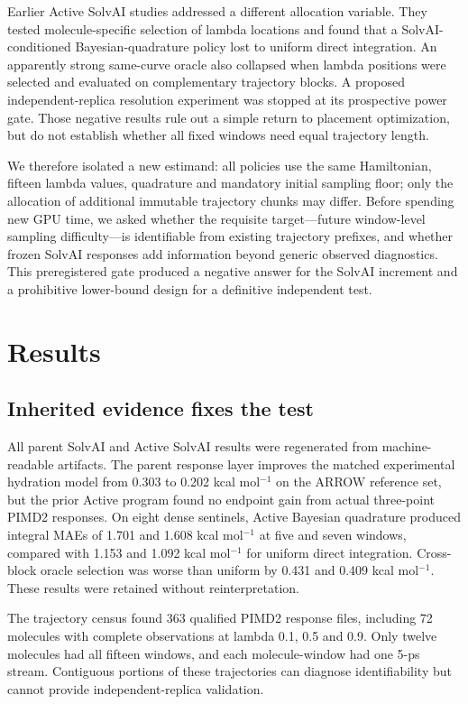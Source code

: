 \documentclass[11pt]{article}
\begin{document}
Earlier Active SolvAI studies addressed a different allocation variable. They tested
molecule-specific selection of lambda locations and found that a SolvAI-conditioned
Bayesian-quadrature policy lost to uniform direct integration. An apparently strong
same-curve oracle also collapsed when lambda positions were selected and evaluated on
complementary trajectory blocks. A proposed independent-replica resolution experiment
was stopped at its prospective power gate. Those negative results rule out a simple
return to placement optimization, but do not establish whether all fixed windows need
equal trajectory length.

We therefore isolated a new estimand: all policies use the same Hamiltonian, fifteen
lambda values, quadrature and mandatory initial sampling floor; only the allocation of
additional immutable trajectory chunks may differ. Before spending new GPU time, we
asked whether the requisite target---future window-level sampling difficulty---is
identifiable from existing trajectory prefixes, and whether frozen SolvAI responses
add information beyond generic observed diagnostics. This preregistered gate produced
a negative answer for the SolvAI increment and a prohibitive lower-bound design for a
definitive independent test.

\section{Results}

\subsection{Inherited evidence fixes the test}

All parent SolvAI and Active SolvAI results were regenerated from machine-readable
artifacts. The parent response layer improves the matched experimental hydration model
from 0.303 to 0.202 kcal mol$^{-1}$ on the ARROW reference set, but the prior Active
program found no endpoint gain from actual three-point PIMD2 responses. On eight dense
sentinels, Active Bayesian quadrature produced integral MAEs of 1.701 and 1.608 kcal
mol$^{-1}$ at five and seven windows, compared with 1.153 and 1.092 kcal mol$^{-1}$
for uniform direct integration. Cross-block oracle selection was worse than uniform by
0.431 and 0.409 kcal mol$^{-1}$. These results were retained without reinterpretation.

The trajectory census found 363 qualified PIMD2 response files, including 72 molecules
with complete observations at lambda 0.1, 0.5 and 0.9. Only twelve molecules had all
fifteen windows, and each molecule-window had one 5-ps stream. Contiguous portions of
these trajectories can diagnose identifiability but cannot provide independent-replica
validation.
\end{document}
